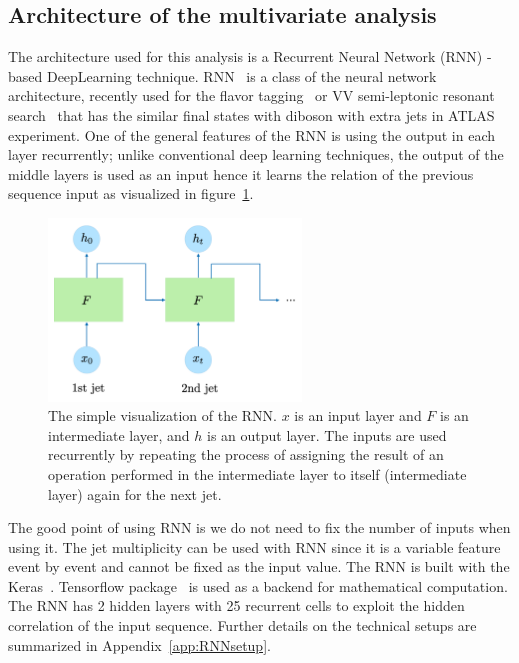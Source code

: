 \subsection{Architecture of the multivariate analysis}
The architecture used for this analysis is a Recurrent Neural Network (RNN) - based DeepLearning technique.
RNN~\cite{Sherstinsky_2020} is a class of the neural network architecture, recently used for the flavor tagging~\cite{ATL-PHYS-PUB-2017-003} or VV semi-leptonic resonant search~\cite{HDBS-2018-10} that has the similar final states with diboson with extra jets in ATLAS experiment.
One of the general features of the RNN is using the output in each layer recurrently; unlike conventional deep learning techniques, the output of the middle layers is used as an input hence it learns the relation of the previous sequence input as visualized in figure~\ref{fig:RNNmodel}. 
\begin{figure}[H]
    \centering
    \includegraphics[width=0.6\textwidth]{figures/RNNmodel}
    \caption{The simple visualization of the RNN. $x$ is an input layer and $F$ is an intermediate layer, and $h$ is an output layer. The inputs are used recurrently by repeating the process of assigning the result of an operation performed in the intermediate layer to itself (intermediate layer) again for the next jet.
    }
    \label{fig:RNNmodel}
\end{figure}
The good point of using RNN is we do not need to fix the number of inputs when using it.
The jet multiplicity can be used with RNN since it is a variable feature event by event and cannot be fixed as the input value.
The RNN is built with the Keras~\cite{chollet2015keras}. 
Tensorflow package~\cite{tensorflow2015-whitepaper} is used as a backend for mathematical computation. 
The RNN has 2 hidden layers with 25 recurrent cells to exploit the hidden correlation of the input sequence.
Further details on the technical setups are summarized in Appendix~\ref{app:RNNsetup}.

